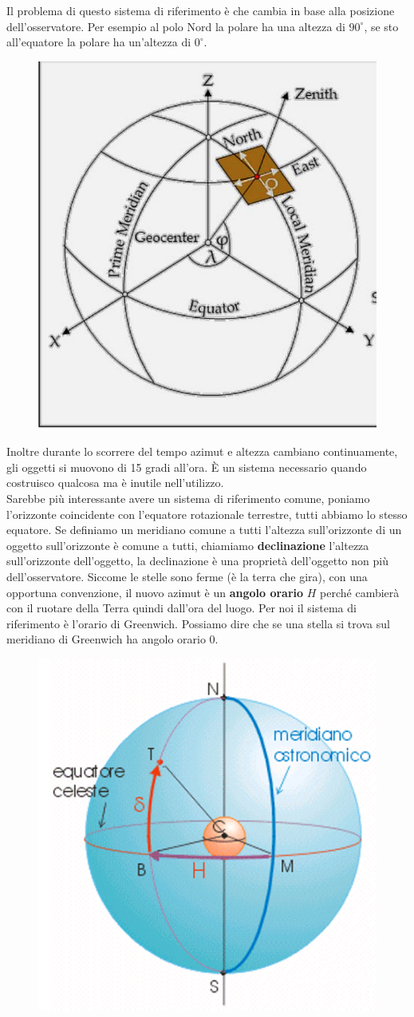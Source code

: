 \documentclass[a4paper,11pt]{article}
\begin{document}
Il problema di questo sistema di riferimento è che cambia in base alla posizione dell'osservatore. Per esempio al polo Nord la polare ha una altezza di $90^\circ$, se sto all'equatore la polare ha un'altezza di $0^\circ$. 
\begin{figure}[ht]
    \centering
    \includegraphics[width=5 cm]{Piano dell'orizzonte sulla terra.png}
\end{figure}
Inoltre durante lo scorrere del tempo azimut e altezza cambiano continuamente, gli oggetti si muovono di 15 gradi all'ora. È un sistema necessario quando costruisco qualcosa ma è inutile nell'utilizzo.\\
Sarebbe più interessante avere un sistema di riferimento comune, poniamo  l'orizzonte coincidente con l'equatore rotazionale terrestre, tutti abbiamo lo stesso equatore. Se definiamo un meridiano comune a tutti l'altezza sull'orizzonte di un oggetto sull'orizzonte è comune a tutti, chiamiamo \textbf{declinazione} l'altezza sull'orizzonte dell'oggetto, la declinazione è una proprietà dell'oggetto non più dell'osservatore. Siccome le stelle sono ferme (è la terra che gira), con una opportuna convenzione, il nuovo azimut è un \textbf{angolo orario} $H$ perché cambierà con il ruotare della Terra quindi dall'ora del luogo. Per noi il sistema di riferimento è l'orario di Greenwich. Possiamo dire che se una stella si trova sul meridiano di Greenwich ha angolo orario 0. 
\begin{figure}[ht]
    \centering
    \includegraphics[width=5 cm]{Coordinate orarie.png}
\end{figure}
\end{document}
